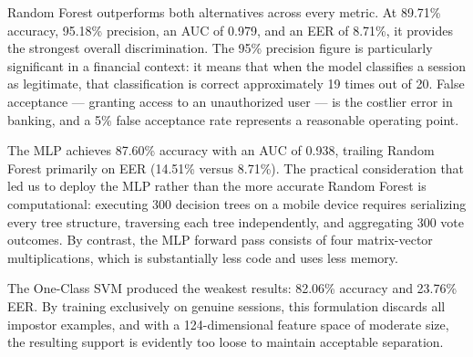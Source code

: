 \documentclass[conference]{IEEEtran}
\begin{document}
Random Forest outperforms both alternatives across every metric. At 89.71\% accuracy, 95.18\% precision, an AUC of 0.979, and an EER of 8.71\%, it provides the strongest overall discrimination. The 95\% precision figure is particularly significant in a financial context: it means that when the model classifies a session as legitimate, that classification is correct approximately 19 times out of 20. False acceptance --- granting access to an unauthorized user --- is the costlier error in banking, and a 5\% false acceptance rate represents a reasonable operating point.

The MLP achieves 87.60\% accuracy with an AUC of 0.938, trailing Random Forest primarily on EER (14.51\% versus 8.71\%). The practical consideration that led us to deploy the MLP rather than the more accurate Random Forest is computational: executing 300 decision trees on a mobile device requires serializing every tree structure, traversing each tree independently, and aggregating 300 vote outcomes. By contrast, the MLP forward pass consists of four matrix-vector multiplications, which is substantially less code and uses less memory.

The One-Class SVM produced the weakest results: 82.06\% accuracy and 23.76\% EER. By training exclusively on genuine sessions, this formulation discards all impostor examples, and with a 124-dimensional feature space of moderate size, the resulting support is evidently too loose to maintain acceptable separation.
\end{document}

